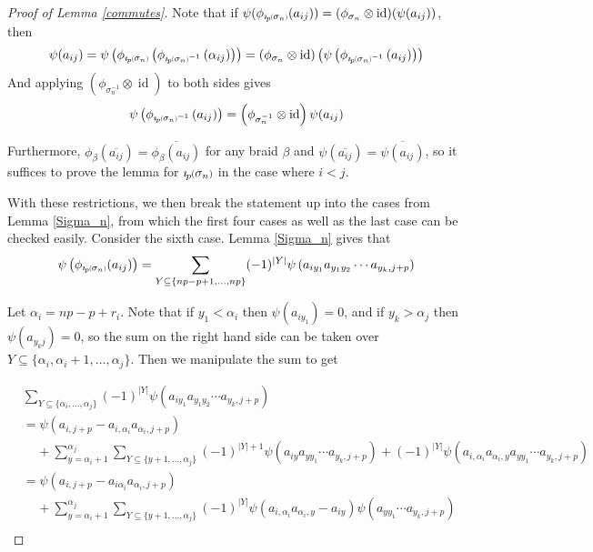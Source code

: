 \documentclass[11pt]{amsart}
\def\s{{\sigma}}
\def\a{\alpha}
\newcommand*{\smallp}[1]{\scalebox{.75}{\ensuremath#1}}
\newcommand*{\subsmallp}[1]{\scalebox{.5}{\ensuremath#1}}
\newcommand{\pp}[2][p]{\imath_{\hspace*{-1pt}#1}\hspace*{-.5pt}\smallp(#2\smallp)}
\newcommand{\subpp}[2][p]{\imath_{\hspace*{-1pt}#1}\hspace*{-.5pt}\subsmallp(#2\subsmallp)}
\newcommand\id{\operatorname{id}}
\theoremstyle{definition}
\begin{document}
\begin{proof} [Proof of Lemma \ref{commutes}]
Note that if $\psi(\phi_{\subpp{\s_n}}(a_{ij})) = (\phi_{\s_n} \otimes \id)(\psi(a_{ij}))$, then
$$\psi(a_{ij}) = \psi\left(\phi_{\subpp{\s_n}}\left(\phi_{\subpp{\s_n}^{-1}}\left(\a_{ij}\right)\right)\right) =  \left(\phi_{\s_n}\otimes\id\right)\left(\psi\left(\phi_{\subpp{\s_n}^{-1}}\left(a_{ij}\right)\right)\right) $$
And applying $\left(\phi_{\s_n^{-1}}\otimes\id\right)$ to both sides gives
$$\psi\left(\phi_{\subpp{\s_n}^{-1}}\left(a_{ij}\right)\right) = \left(\phi_{\s_n^{-1}}\otimes\id\right)\psi(a_{ij})$$

Furthermore, $\phi_\beta(\overline{a_{ij}}) = \overline{\phi_\beta(a_{ij})}$ for any braid $\beta$  and $\psi(\overline{a_{ij}}) = \overline{\psi(a_{ij})}$, so it suffices to prove the lemma for $\pp{\s_n}$ in the case where $i<j$.

With these restrictions, we then break the statement up into the cases from Lemma \ref{Sigma_n}, from which the first four cases as well as the last case can be checked easily.  Consider the sixth case.  Lemma \ref{Sigma_n} gives that
$$\psi\left(\phi_{\subpp{\s_n}}(a_{ij})\right) = \sum_{Y\subseteq \{np-p+1,\ldots,np\}}(-1)^{|Y|}\psi\left(a_{iy_1}a_{y_1y_2}\cdots a_{y_k,j+p}\right)$$


Let $\a_i  = np-p+r_i$.  Note that if $y_1<\a_i$ then $\psi(a_{iy_1}) = 0$, and if $y_k>\a_j$ then $\psi(a_{y_kj}) = 0$, so the sum on the right hand side can be taken over $Y\subseteq\{\a_i,\a_i+1,\ldots,\a_j\}$.  Then we manipulate the sum to get

\begin{align*}
& \sum_{Y\subseteq \{\a_i,\ldots,\a_j\}}(-1)^{|Y|}\psi\left(a_{iy_1}a_{y_1y_2}\cdots a_{y_k,j+p}\right)\\
&= \psi\left(a_{i,j+p} - a_{i,\a_i}a_{\a_i,j+p}\right)\\
& \;\;\;\;+ \sum_{y=\a_i+1}^{\a_j}\sum_{Y\subseteq \{y+1,\ldots,\a_j\}}(-1)^{|Y|+1}\psi\left(a_{iy}a_{yy_1}\cdots a_{y_k,j+p}\right) + (-1)^{|Y|}\psi\left(a_{i,\a_i}a_{\a_i,y}a_{yy_1}\cdots a_{y_k,j+p}\right)\\
&= \psi\left(a_{i,j+p} - a_{i\a_i}a_{\a_i,j+p}\right)\\
& \;\;\;\;+ \sum_{y=\a_i+1}^{\a_j}\sum_{Y\subseteq \{y+1,\ldots,\a_j\}}(-1)^{|Y|}\psi\left(a_{i,\a_i}a_{\a_i,y} - a_{iy}\right)\psi\left(a_{yy_1}\cdots a_{y_k,j+p}\right)\\
\end{align*}




\end{proof}
\end{document}
